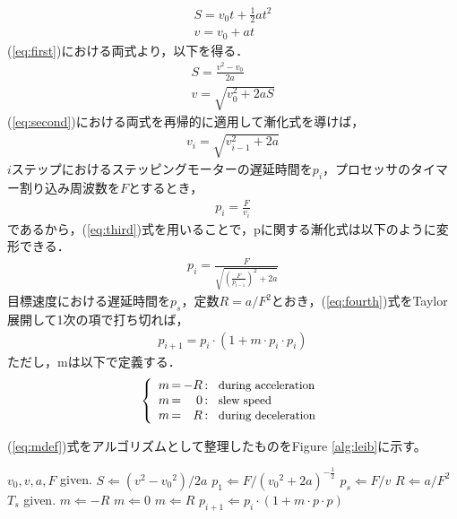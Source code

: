 \documentclass[twocolumn,oneside,a4paper]{article}
\begin{document}
\begin{eqnarray}\label{eq:first}
	S = v_0 t + \frac{1}{2} a t^2 \nonumber \\
	v = v_0 + a t	
\end{eqnarray}
(\ref{eq:first})における両式より，以下を得る．
\begin{eqnarray}\label{eq:second}
	S = \frac{v^2-v_0}{2 a} \nonumber \\
	v = \sqrt{v_0^2+2aS}
\end{eqnarray}
(\ref{eq:second})における両式を再帰的に適用して漸化式を導けば，
\begin{eqnarray}\label{eq:third}
	v_i = \sqrt{v_{i-1}^2 + 2a}
\end{eqnarray}
$i$ステップにおけるステッピングモーターの遅延時間を$p_i$，プロセッサのタイマー割り込み周波数を$F$とするとき，
\begin{eqnarray*}
	p_i = \frac{F}{v_i}
\end{eqnarray*}
であるから，(\ref{eq:third})式を用いることで，pに関する漸化式は以下のように変形できる．
\begin{eqnarray}\label{eq:fourth}
	p_i = \frac{F}{\sqrt{{(\frac{F}{p_{i-1}})}^2+2a}} 
\end{eqnarray}
目標速度における遅延時間を$p_s$，定数$R= a/F^2$とおき，(\ref{eq:fourth})式をTaylor展開して1次の項で打ち切れば，
\begin{eqnarray}\label{eq:pupdate}
	p_{i+1} = p_i \cdot (1 + m \cdot p_i \cdot p_i) 
\end{eqnarray}
ただし，mは以下で定義する．
\begin{eqnarray}\label{eq:mdef}
\left\{
\begin{array}{r@{\,}c@{\,}r@{\,}c@{\,}l@{\;\;}r}
 m &=& -R &:& \:\:\: \mbox{\small during acceleration}\\
 m &=& 0 &:&  \:\:\: \mbox{\small slew speed}\\
 m &=& R &:&  \:\:\: \mbox{\small during deceleration}
\end{array}%
\right.
\end{eqnarray}

(\ref{eq:mdef})式をアルゴリズムとして整理したものをFigure \ref{alg:leib}に示す。

\begin{algorithm}                  
\begin{algorithmic}                  
\label{alg:leib}                          
\STATE $v_0, v, a, F$ given.
\STATE $S \Leftarrow (v^2-{v_0}^2) / 2 a$
\STATE $p_1 \Leftarrow F / ({v_0}^2 + 2a)^{-\frac{1}{2}}$
\STATE $p_s \Leftarrow F/v$
\STATE $R \Leftarrow a / F^2$
\STATE $T_s$ given.
  \STATE $m \Leftarrow -R$
  \STATE $m \Leftarrow 0$
\ELSE
  \STATE $m \Leftarrow R$
\ENDIF
\STATE $p_{i+1} \Leftarrow p_i \cdot (1+m\cdot p \cdot p)$
\ENDFOR
\end{algorithmic}
\end{algorithm}
\vspace{-0.7cm}
\vspace{0.3cm}
\end{document}
